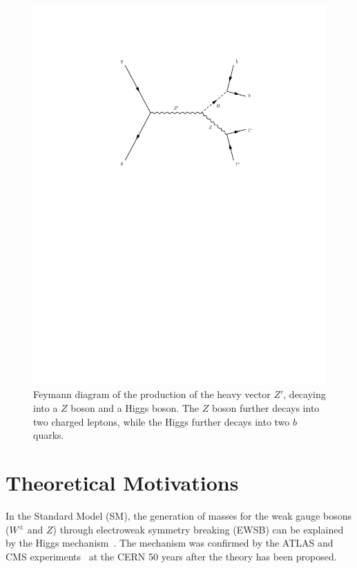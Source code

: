 \begin{figure}[t]
  \centering
  \includegraphics[width=1\textwidth,trim=0 400 0 100,clip=true]{Figures/feymann/qqZpZHllbb.pdf}
  \caption{Feymann diagram of the production of the heavy vector $Z'$, decaying into a $Z$ boson and a Higgs boson. The $Z$ boson further decays into two charged leptons, while the Higgs further decays into two $b$ quarks.}
  \label{fig:fey_signal}
\end{figure}

\section{Theoretical Motivations}

In the Standard Model (SM), the generation of masses for the weak gauge bosons ($W^\pm$ and $Z$) through electroweak symmetry breaking (EWSB) can be explained by the Higgs mechanism~\cite{PhysRevLett.13.508}. The mechanism was confirmed by the ATLAS and CMS experiments~\cite{Aad:2012tfa,Chatrchyan:2012xdj,Chatrchyan:2013lba} at the CERN 50 years after the theory has been proposed.

